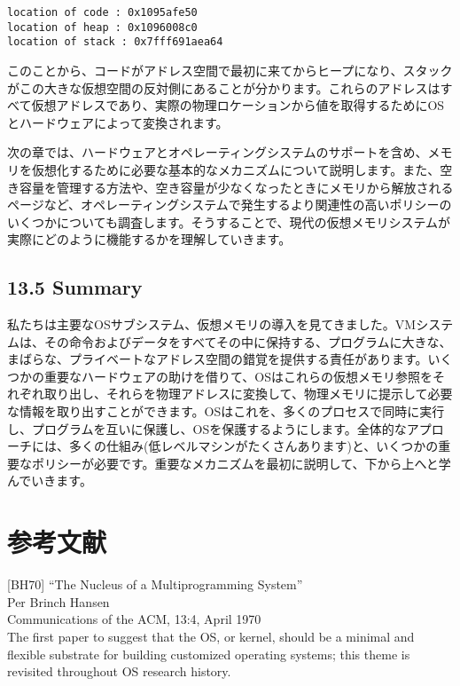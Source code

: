 \begin{verbatim}
location of code : 0x1095afe50
location of heap : 0x1096008c0
location of stack : 0x7fff691aea64
\end{verbatim}

このことから、コードがアドレス空間で最初に来てからヒープになり、スタックがこの大きな仮想空間の反対側にあることが分かります。これらのアドレスはすべて仮想アドレスであり、実際の物理ロケーションから値を取得するためにOSとハードウェアによって変換されます。

次の章では、ハードウェアとオペレーティングシステムのサポートを含め、メモリを仮想化するために必要な基本的なメカニズムについて説明します。また、空き容量を管理する方法や、空き容量が少なくなったときにメモリから解放されるページなど、オペレーティングシステムで発生するより関連性の高いポリシーのいくつかについても調査します。そうすることで、現代の仮想メモリシステムが実際にどのように機能するかを理解していきます。

\hypertarget{summary-5}{%
\subsection*{13.5 Summary}\label{summary-5}}

私たちは主要なOSサブシステム、仮想メモリの導入を見てきました。VMシステムは、その命令およびデータをすべてその中に保持する、プログラムに大きな、まばらな、プライベートなアドレス空間の錯覚を提供する責任があります。いくつかの重要なハードウェアの助けを借りて、OSはこれらの仮想メモリ参照をそれぞれ取り出し、それらを物理アドレスに変換して、物理メモリに提示して必要な情報を取り出すことができます。OSはこれを、多くのプロセスで同時に実行し、プログラムを互いに保護し、OSを保護するようにします。全体的なアプローチには、多くの仕組み(低レベルマシンがたくさんあります)と、いくつかの重要なポリシーが必要です。重要なメカニズムを最初に説明して、下から上へと学んでいきます。

\hypertarget{ux53c2ux8003ux6587ux732e-5}{%
\section*{参考文献}\label{ux53c2ux8003ux6587ux732e-5}}

{[}BH70{]} ``The Nucleus of a Multiprogramming System''\\
Per Brinch Hansen\\
Communications of the ACM, 13:4, April 1970\\
The first paper to suggest that the OS, or kernel, should be a minimal
and flexible substrate for building customized operating systems; this
theme is revisited throughout OS research history.

